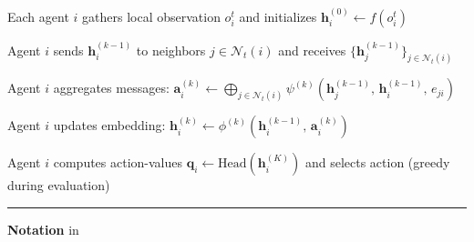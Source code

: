 \begin{algorithm}[H]
    \caption{Decentralized DGQL execution (per environment step)}
    \label{alg:decentralized}

    \begin{algorithmic}[1]
        \State Each agent \(i\) gathers local observation \(o_i^t\) and initializes \(\mathbf{h}_i^{(0)}\leftarrow f(o_i^t)\)

            \State Agent \(i\) sends \(\mathbf{h}_i^{(k-1)}\) to neighbors \(j\in\mathcal{N}_t(i)\) and receives \(\{\mathbf{h}_j^{(k-1)}\}_{j\in\mathcal{N}_t(i)}\)

            \State Agent \(i\) aggregates messages: \(\mathbf{a}_i^{(k)}\leftarrow\bigoplus_{j\in\mathcal{N}_t(i)} \psi^{(k)}(\mathbf{h}_j^{(k-1)},\,\mathbf{h}_i^{(k-1)},\,e_{ji})\)

            \State Agent \(i\) updates embedding: \(\mathbf{h}_i^{(k)}\leftarrow \phi^{(k)}(\mathbf{h}_i^{(k-1)},\,\mathbf{a}_i^{(k)})\)
        \EndFor

        \State Agent \(i\) computes action-values \(\mathbf{q}_i\leftarrow \text{Head}(\mathbf{h}_i^{(K)})\) and selects action (greedy during evaluation)
    \end{algorithmic}

    \vspace{2pt}
    \hrule
    \vspace{4pt}

    {
        {\small \textbf{Notation} in }
    }
\end{algorithm}\vspace{-12pt}





